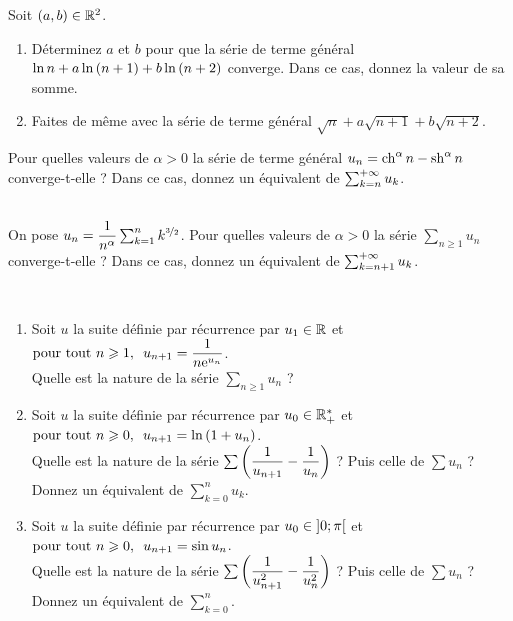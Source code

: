 \begin{exoss}[Exercice 4]
Soit \(\left(a,b\right)\in\mathbb{R}^2\).

\begin{enumerate}
    \item Déterminez \(a\) et \(b\) pour que la série de terme général \(\ln n+a\ln\left(n+1\right)+b\ln\left(n+2\right)\) converge. Dans ce cas, donnez la valeur de sa somme. \\
    \item Faites de même avec la série de terme général \(\sqrt{n}+a\sqrt{n+1}+b\sqrt{n+2}\).
\end{enumerate}
\end{exoss}



\begin{exoss}[Exercice 5]
Pour quelles valeurs de \(\alpha>0\) la série de terme général \(u_n=\operatorname{ch}^\alpha n-\operatorname{sh}^\alpha n\) converge-t-elle ? Dans ce cas, donnez un équivalent de \(\sum_{k=n}^{+\infty}u_k\).
\end{exoss}



\begin{exoss}[Exercice 6]~\\
On pose \(u_n=\dfrac{1}{n^\alpha}\sum_{k=1}^nk^{\nicefrac{3}{2}}\). Pour quelles valeurs de \(\alpha>0\) la série \(\sum_{n\geq1}u_n\) converge-t-elle ? Dans ce cas, donnez un équivalent de \(\sum_{k=n+1}^{+\infty}u_k\).
\end{exoss}



\begin{exoss}~\\
\begin{enumerate}
    \item Soit \(u\) la suite définie par récurrence par \(u_1\in\mathbb{R}\) et \(\quantifs{\tpt n\geq1}u_{n+1}=\dfrac{1}{n\e{u_n}}\). \\ Quelle est la nature de la série \(\sum_{n\geq1}u_n\) ? \\
    \item Soit \(u\) la suite définie par récurrence par \(u_0\in\mathbb{R}_+^*\) et \(\quantifs{\tpt n\geq0}u_{n+1}=\ln\paren{1+u_n}\). \\ Quelle est la nature de la série \(\sum\left(\dfrac{1}{u_{n+1}}-\dfrac{1}{u_n}\right)\) ? Puis celle de \(\sum u_n\) ? Donnez un équivalent de \(\sum_{k=0}^nu_k\). \\
    \item Soit \(u\) la suite définie par récurrence par \(u_0\in\left]0;\pi\right[\) et \(\quantifs{\tpt n\geq0}u_{n+1}=\sin u_n\). \\ Quelle est la nature de la série \(\sum\left(\dfrac{1}{u_{n+1}^2}-\dfrac{1}{u_n^2}\right)\) ? Puis celle de \(\sum u_n\) ? Donnez un équivalent de \(\sum_{k=0}^n\).
\end{enumerate}
\end{exoss}



